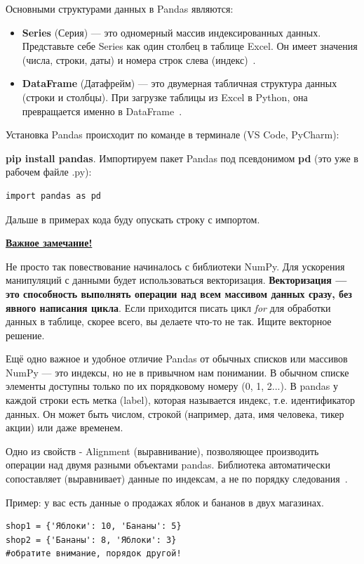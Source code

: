 \documentclass[pract]{SCWorks}
\begin{document}
Основными структурами данных в Pandas являются:

\begin{itemize}
    \item \textbf{Series} (Серия) — это одномерный массив индексированных данных.
    Представьте себе Series как один столбец в таблице Excel. Он имеет значения (числа, строки, даты) и 
    номера строк слева (индекс)~\cite{mckinney}.
    \item \textbf{DataFrame} (Датафрейм) — это двумерная табличная структура данных (строки и столбцы).
    При загрузке таблицы из Excel в Python, она превращается именно в DataFrame~\cite{mckinney}.
\end{itemize}


Установка Pandas происходит по команде в терминале (VS Code, PyCharm): 

\textbf{pip install pandas}. 
Импортируем пакет Pandas под псевдонимом \textbf{pd} (это уже в рабочем файле .py):
\begin{verbatim}
import pandas as pd  
\end{verbatim}
Дальше в примерах кода буду опускать строку с импортом.

\textbf{\underline{Важное замечание!}}

Не просто так повествование начиналось с библиотеки NumPy. Для ускорения манипуляций с данными будет использоваться
векторизация. \textbf{Векторизация — это способность выполнять операции над всем массивом 
данных сразу, без явного написания цикла}.
Если приходится писать цикл \textit{for} для обработки данных в таблице, скорее всего, вы делаете что-то 
не так. Ищите векторное решение.

Ещё одно важное и удобное отличие Pandas от обычных списков или массивов NumPy — это индексы, но не 
в привычном нам понимании.
В обычном списке элементы доступны только по их порядковому номеру (0, 1, 2...). В pandas у каждой строки 
есть метка (label), которая называется индекс, т.е. идентификатор данных. 
Он может быть числом, строкой (например, дата, имя человека, тикер акции) или даже временем.

Одно из свойств - Alignment (выравнивание), позволяющее производить операции над двумя разными объектами pandas. 
Библиотека автоматически сопоставляет (выравнивает) данные по индексам, а не по порядку следования~\cite{mckinney}.

Пример: у вас есть данные о продажах яблок и бананов в двух магазинах.

\begin{verbatim}
shop1 = {'Яблоки': 10, 'Бананы': 5}
shop2 = {'Бананы': 8, 'Яблоки': 3}
#обратите внимание, порядок другой!
\end{verbatim}
\end{document}
